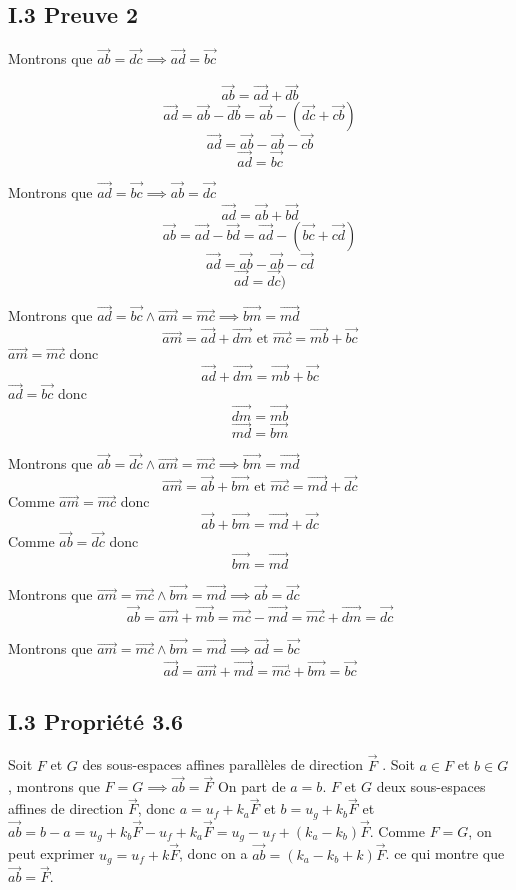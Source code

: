 \documentclass[]{book}
\theoremstyle{definition}
\newcommand{\vect}[1]{\overrightarrow{#1}}
\begin{document}
\subsection*{I.3 Preuve 2}
Montrons que $\vect{ab} = \vect{dc} \implies \vect{ad} = \vect{bc}$

$$\vect{ab} = \vect{ad} + \vect{db}$$
$$\vect{ad} = \vect{ab} - \vect{db} = \vect{ab} - (\vect{dc}+ \vect{cb})$$
$$\vect{ad} = \vect{ab} - \vect{ab} - \vect{cb}$$
$$\vect{ad} = \vect{bc}$$

Montrons que $\vect{ad} = \vect{bc} \implies \vect{ab} = \vect{dc}$
$$\vect{ad} = \vect{ab} + \vect{bd}$$
$$\vect{ab} = \vect{ad} - \vect{bd} = \vect{ad} - (\vect{bc}+ \vect{cd})$$
$$\vect{ad} = \vect{ab} - \vect{ab} - \vect{cd}$$
$$\vect{ad} = \vect{dc})$$

Montrons que $\vect{ad} = \vect{bc} \land \vect{am} = \vect{mc} \implies \vect{bm} = \vect{md}$
$$\vect{am}  = \vect{ad} + \vect{dm} \text{ et } \vect{mc}  = \vect{mb} + \vect{bc}$$ 
$\vect{am} = \vect{mc}$ donc
$$\vect{ad} + \vect{dm} = \vect{mb} + \vect{bc}$$
$\vect{ad} = \vect{bc}$ donc
$$\vect{dm} = \vect{mb}$$
$$\vect{md} = \vect{bm}$$

Montrons que $\vect{ab} = \vect{dc} \land \vect{am} = \vect{mc} \implies \vect{bm} = \vect{md}$
$$\vect{am}  = \vect{ab} + \vect{bm} \text{ et } \vect{mc}  = \vect{md} + \vect{dc}$$ 
Comme $\vect{am} = \vect{mc}$ donc
$$\vect{ab} + \vect{bm} = \vect{md} + \vect{dc}$$
Comme $\vect{ab} = \vect{dc}$ donc
$$\vect{bm} = \vect{md}$$

Montrons que $ \vect{am} = \vect{mc} \land \vect{bm} = \vect{md} \implies \vect{ab} = \vect{dc}$
$$\vect{ab} = \vect{am} + \vect{mb} = \vect{mc} - \vect{md} = \vect{mc} + \vect{dm} = \vect{dc}$$

Montrons que $ \vect{am} = \vect{mc} \land \vect{bm} = \vect{md} \implies \vect{ad} = \vect{bc}$
$$\vect{ad} = \vect{am} + \vect{md} = \vect{mc} + \vect{bm} =  \vect{bc}$$

\subsection*{I.3 Propri\'et\'e 3.6}
Soit $F$ et $G$ des sous-espaces affines parall\`eles de direction $\vect{F}$ . Soit $a \in F$ et $b \in G$, montrons que $F = G \implies \vect{ab} = \vect{F}$ On part de $a = b$. $F$ et $G$ deux sous-espaces affines de direction $\vect{F}$, donc $a = u_f + k_a\vect{F}$ et $b = u_g + k_b\vect{F}$ et $\vect{ab} = b - a = u_g + k_b\vect{F} - u_f + k_a\vect{F} = u_g - u_f + (k_a - k_b)\vect{F}$. Comme $F=G$, on peut exprimer $u_g = u_f + k\vect{F}$, donc on a $\vect{ab} = (k_a-k_b+k)\vect{F}$. ce qui montre que $\vect{ab} = \vect{F}$.
\end{document}
